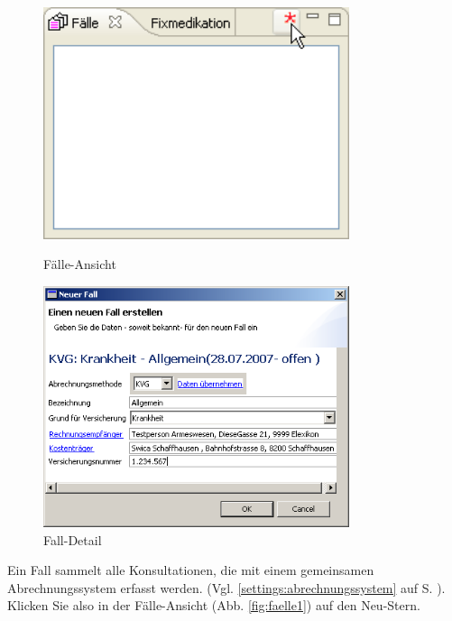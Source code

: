 \begin{figure}[htbp]
     \begin{minipage}{0.4\textwidth}
      \centering
       \includegraphics[width=0.8\textwidth]{images/einf3}
       \caption{Fälle-Ansicht}
       	\label{fig:faelle1}
     \end{minipage}\hfill
     \begin{minipage}{0.5\textwidth}
      \centering
       \includegraphics[width=0.8\textwidth]{images/einf4}
       \caption{Fall-Detail}
       \label{fig:falldetail}
     \end{minipage}
   \end{figure}


Ein Fall sammelt alle Konsultationen, die mit einem gemeinsamen Abrechnungssystem erfasst werden. (Vgl. \ref{settings:abrechnungssystem} auf S. \pageref{settings:abrechnungssystem}).
Klicken Sie also in der \glqq Fälle\grqq{}-Ansicht
(Abb. \ref{fig:faelle1}) auf den \glqq Neu\grqq{}-Stern.

